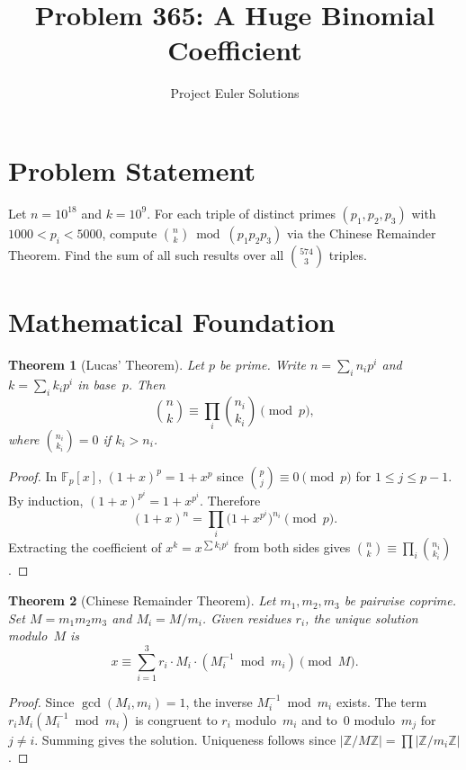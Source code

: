 \documentclass[11pt]{article}
\title{Problem 365: A Huge Binomial Coefficient}
\author{Project Euler Solutions}
\date{}
\newtheorem{theorem}{Theorem}
\begin{document}
\maketitle

\section{Problem Statement}

Let $n = 10^{18}$ and $k = 10^{9}$. For each triple of distinct primes $(p_1, p_2, p_3)$ with $1000 < p_i < 5000$, compute $\binom{n}{k} \bmod (p_1 p_2 p_3)$ via the Chinese Remainder Theorem. Find the sum of all such results over all $\binom{574}{3}$ triples.

\section{Mathematical Foundation}

\begin{theorem}[Lucas' Theorem]
Let $p$ be prime. Write $n = \sum_{i} n_i p^i$ and $k = \sum_{i} k_i p^i$ in base~$p$. Then
\[
\binom{n}{k} \equiv \prod_{i} \binom{n_i}{k_i} \pmod{p},
\]
where $\binom{n_i}{k_i} = 0$ if $k_i > n_i$.
\end{theorem}

\begin{proof}
In $\mathbb{F}_p[x]$, $(1+x)^p = 1 + x^p$ since $\binom{p}{j} \equiv 0 \pmod{p}$ for $1 \le j \le p-1$. By induction, $(1+x)^{p^i} = 1 + x^{p^i}$. Therefore
\[
(1+x)^n = \prod_i \bigl(1 + x^{p^i}\bigr)^{n_i} \pmod{p}.
\]
Extracting the coefficient of $x^k = x^{\sum k_i p^i}$ from both sides gives $\binom{n}{k} \equiv \prod_i \binom{n_i}{k_i}$.
\end{proof}

\begin{theorem}[Chinese Remainder Theorem]
Let $m_1, m_2, m_3$ be pairwise coprime. Set $M = m_1 m_2 m_3$ and $M_i = M/m_i$. Given residues $r_i$, the unique solution modulo~$M$ is
\[
x \equiv \sum_{i=1}^{3} r_i \cdot M_i \cdot (M_i^{-1} \bmod m_i) \pmod{M}.
\]
\end{theorem}

\begin{proof}
Since $\gcd(M_i, m_i) = 1$, the inverse $M_i^{-1} \bmod m_i$ exists. The term $r_i M_i (M_i^{-1} \bmod m_i)$ is congruent to $r_i$ modulo~$m_i$ and to~$0$ modulo~$m_j$ for $j \neq i$. Summing gives the solution. Uniqueness follows since $|\mathbb{Z}/M\mathbb{Z}| = \prod |\mathbb{Z}/m_i\mathbb{Z}|$.
\end{proof}
\end{document}
